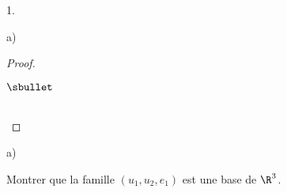 \documentclass[11pt]{article}%
\begin{document}
\begin{noliste}{1.}
\begin{noliste}{a)}
\begin{proof}
\begin{remark}
\begin{noliste}{$\sbullet$}

        \end{noliste}
      \end{remark}~\\[-1.4cm]
    \end{proof}
  \end{noliste}


\newpage


\item 
  \begin{noliste}{a)}
    \setlength{\itemsep}{2mm}
  \item Montrer que la famille $(u_1, u_2, e_1)$ est une base de $\R^3$.


\end{noliste}
\end{noliste}
\end{document}
